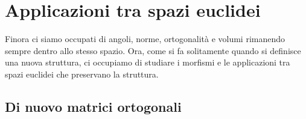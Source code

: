 \documentclass[11pt]{scrartcl}
\begin{document}
   	 \newpage
   	 
   	 \section{Applicazioni tra spazi euclidei}
   	 
   	 
   	 Finora ci siamo occupati di angoli, norme, ortogonalità e volumi rimanendo sempre dentro allo stesso spazio. Ora, come si fa solitamente quando si definisce una nuova struttura, ci occupiamo di studiare i morfismi e le applicazioni tra spazi euclidei che preservano la struttura. \\
   	 
   	 \subsection{Di nuovo matrici ortogonali}
   	 
\end{document}

